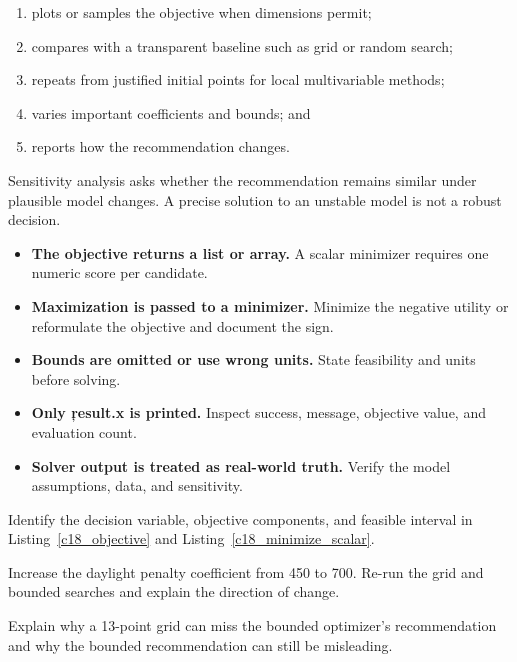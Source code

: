 \begin{enumerate}
    \item plots or samples the objective when dimensions permit;
    \item compares with a transparent baseline such as grid or random search;
    \item repeats from justified initial points for local multivariable methods;
    \item varies important coefficients and bounds; and
    \item reports how the recommendation changes.
\end{enumerate}

Sensitivity analysis asks whether the recommendation remains similar under
plausible model changes. A precise solution to an unstable model is not a robust
decision.


\begin{itemize}
    \item \textbf{The objective returns a list or array.} A scalar minimizer
          requires one numeric score per candidate.
    \item \textbf{Maximization is passed to a minimizer.} Minimize the negative
          utility or reformulate the objective and document the sign.
    \item \textbf{Bounds are omitted or use wrong units.} State feasibility and
          units before solving.
    \item \textbf{Only \c{result.x} is printed.} Inspect success, message,
          objective value, and evaluation count.
    \item \textbf{Solver output is treated as real-world truth.} Verify the
          model assumptions, data, and sensitivity.
\end{itemize}



Identify the decision variable, objective components, and feasible interval in
Listing~\ref{c18_objective} and Listing~\ref{c18_minimize_scalar}.


Increase the daylight penalty coefficient from 450 to 700. Re-run the grid and
bounded searches and explain the direction of change.


Explain why a 13-point grid can miss the bounded optimizer's recommendation and
why the bounded recommendation can still be misleading.

